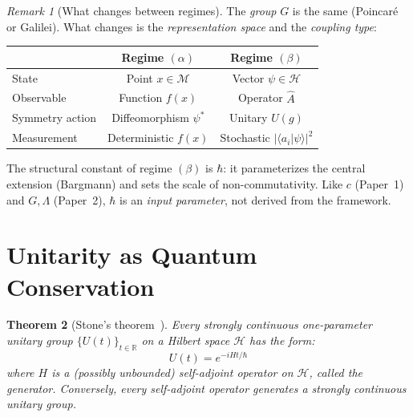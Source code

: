 \documentclass[12pt]{article}
\theoremstyle{plain}
\newtheorem{theorem}{Theorem}[section]
\theoremstyle{definition}
\theoremstyle{remark}
\newtheorem{remark}[theorem]{Remark}
\begin{document}
\begin{remark}[What changes between regimes]
The \emph{group} $G$ is the same (Poincar\'e or Galilei). What changes is the \emph{representation space} and the \emph{coupling type}:
\begin{center}\small
\begin{tabular}{lcc}\toprule
& \textbf{Regime $(\alpha)$} & \textbf{Regime $(\beta)$} \\\midrule
State & Point $x \in \mathcal{M}$ & Vector $\psi \in \mathcal{H}$ \\
Observable & Function $f(x)$ & Operator $\hat{A}$ \\
Symmetry action & Diffeomorphism $\psi^*$ & Unitary $U(g)$ \\
Measurement & Deterministic $f(x)$ & Stochastic $|\langle a_i|\psi\rangle|^2$ \\
\bottomrule
\end{tabular}
\end{center}
The structural constant of regime $(\beta)$ is $\hbar$: it parameterizes the central extension (Bargmann) and sets the scale of non-commutativity. Like $c$ (Paper~1) and $G, \Lambda$ (Paper~2), $\hbar$ is an \emph{input parameter}, not derived from the framework.
\end{remark}


\section{Unitarity as Quantum Conservation}
\label{sec:unitarity}

\begin{theorem}[Stone's theorem~\cite{stone1932,reed1972}]\label{thm:stone}
Every strongly continuous one-parameter unitary group $\{U(t)\}_{t \in \mathbb{R}}$ on a Hilbert space $\mathcal{H}$ has the form:
\begin{equation}
U(t) = e^{-iHt/\hbar}
\end{equation}
where $H$ is a (possibly unbounded) self-adjoint operator on $\mathcal{H}$, called the \emph{generator}. Conversely, every self-adjoint operator generates a strongly continuous unitary group.
\end{theorem}
\end{document}
